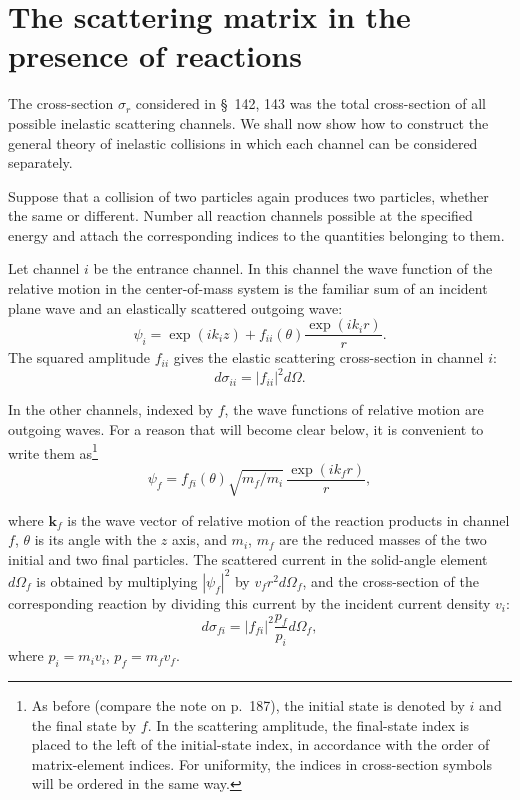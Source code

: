 \section{The scattering matrix in the presence of reactions}

The cross-section $\sigma_r$ considered in \S~142, 143 was the total
cross-section of all possible inelastic scattering channels. We shall now
show how to construct the general theory of inelastic collisions in which
each channel can be considered separately.

Suppose that a collision of two particles again produces two particles,
whether the same or different. Number all reaction channels possible at the
specified energy and attach the corresponding indices to the quantities
belonging to them.

Let channel $i$ be the entrance channel. In this channel the wave function of
the relative motion in the center-of-mass system is the familiar sum of an
incident plane wave and an elastically scattered outgoing wave:
\begin{equation}
 \psi_i=\exp(ik_i z)+f_{ii}(\theta)\frac{\exp(ik_i r)}r.
 \tag{144.1}
\end{equation}
The squared amplitude $f_{ii}$ gives the elastic scattering cross-section in
channel $i$:
\begin{equation}
 d\sigma_{ii}=|f_{ii}|^2d\Omega.
 \tag{144.2}
\end{equation}

In the other channels, indexed by $f$, the wave functions of relative motion
are outgoing waves. For a reason that will become clear below, it is
convenient to write them as\footnote{As before (compare the note on p.~187),
the initial state is denoted by $i$ and the final state by $f$. In the
scattering amplitude, the final-state index is placed to the left of the
initial-state index, in accordance with the order of matrix-element indices.
For uniformity, the indices in cross-section symbols will be ordered in the
same way.}
\begin{equation}
 \psi_f=f_{fi}(\theta)\sqrt{m_f/m_i}\,\frac{\exp(ik_f r)}r,
 \tag{144.3}
\end{equation}

where $\mathbf{k}_f$ is the wave vector of relative motion of the reaction
products in channel $f$, $\theta$ is its angle with the $z$ axis, and $m_i$,
$m_f$ are the reduced masses of the two initial and two final particles. The
scattered current in the solid-angle element $d\Omega_f$ is obtained by
multiplying $|\psi_f|^2$ by $v_fr^2d\Omega_f$, and the cross-section of the
corresponding reaction by dividing this current by the incident current
density $v_i$:
\begin{equation}
 d\sigma_{fi}=|f_{fi}|^2\frac{p_f}{p_i}d\Omega_f,
 \tag{144.4}
\end{equation}
where $p_i=m_iv_i$, $p_f=m_fv_f$.

